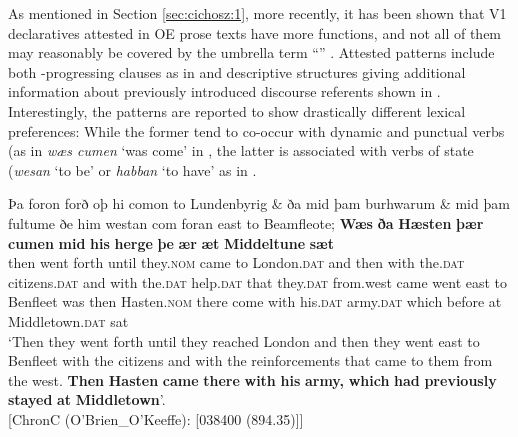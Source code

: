 \documentclass[output=paper,colorlinks,citecolor=brown]{langscibook}
\begin{document}
As mentioned in Section \ref{sec:cichosz:1}, more recently, it has been shown that V1 declaratives attested in OE prose texts have more functions, and not all of them may reasonably be covered by the umbrella term “” \citep{Cichosz2022}. Attested patterns include both -progressing clauses as in  and descriptive structures giving additional information about previously introduced discourse referents shown in . Interestingly, the patterns are reported to show drastically different lexical preferences: While the former tend to co-occur with dynamic and punctual verbs (as in \textit{wæs cumen} ‘was come' in , the latter is associated with verbs of state ({\textit{wesan}} ‘to be' or \textit{habban} ‘to have' as in .

\ea%
\label{ex:cichosz:3}
\gll Þa  foron  forð  oþ  hi   comon  to  Lundenbyrig  \& ða mid  þam   burhwarum  \& mid  þam   fultume  ðe him    westan     com   foran   east   to   Beamfleote; \textbf{Wæs}   \textbf{ða}   \textbf{Hæsten}   \textbf{þær}   \textbf{cumen}   \textbf{mid}   \textbf{his}     \textbf{herge} \textbf{þe}   \textbf{ær}   \textbf{æt}   \textbf{Middeltune}     \textbf{sæt}\\
then  went  forth  until  they.\textsc{nom}  came  to  London.\textsc{dat}  and  then  with  the.\textsc{dat}  citizens.\textsc{dat}  and  with  the.\textsc{dat}  help.\textsc{dat}  that   they.\textsc{dat}  from.west  came  went  east  to  Benfleet was  then  Hasten.\textsc{nom}  there  come  with  his.\textsc{dat}  army.\textsc{dat} which  before  at  Middletown.\textsc{dat}  sat \\
\glt ‘Then they went forth until they reached London and then they went east to Benfleet with the citizens and with the reinforcements that came to them from the west. \textbf{Then} \textbf{Hasten} \textbf{came} \textbf{there} \textbf{with} \textbf{his} \textbf{army,} \textbf{which} \textbf{had} \textbf{previously} \textbf{stayed} \textbf{at} \textbf{Middletown}'.\\ \hfill [ChronC (O'Brien\_O'Keeffe): [038400 (894.35)]]
\z 
        
\end{document}
